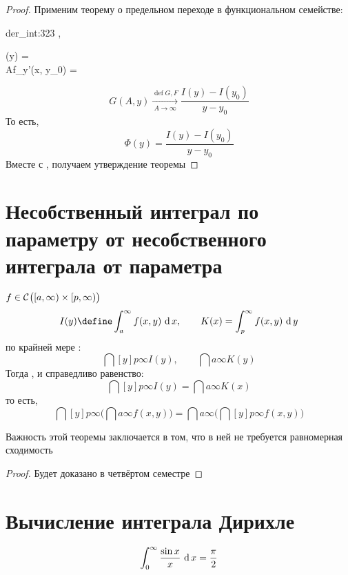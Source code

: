 \begin{proof}
	Применим теорему о предельном переходе в функциональном семействе:
	\begin{equ}{der_int:323}
		,  \implies
		\begin{cases}
			\exist {} \Phi(y) =  \\
			\exist {} A{f_y'(x, y_0)} = 
		\end{cases}
	\end{equ}
	$$ G(A, y) \xrightarrow[A \to \infty]{\operatorname{def} G, F} \frac{I(y) - I(y_0)}{y - y_0} $$
	То есть,
	$$ \Phi(y) = \frac{I(y) - I(y_0)}{y - y_0} $$
	Вместе с , получаем утверждение теоремы
\end{proof}

\section{Несобственный интеграл по параметру от несобственного интеграла от параметра}

\begin{theorem}
	$ f \in \Cont{[a, \infty) \times [p, \infty)} $
	$$ I(y) \define \dint{a}\infty{f(x, y)}, \qquad K(x) = \dint[y]p\infty{f(x, y)} $$
	 по крайней мере :
	$$ \dint[y]p\infty{I(y)}, \qquad \dint{a}\infty{K(y)} $$
	Тогда , и справедливо равенство:
	$$ \dint[y]p\infty{I(y)} \bm= \dint{a}\infty{K(x)} $$
	то есть,
	$$ \dint[y]p\infty{\bigg( \dint{a}\infty{f(x, y)} \bigg)} \bm= \dint{a}\infty{\bigg( \dint[y]p\infty{f(x, y)} \bigg)} $$
\end{theorem}

\begin{remark}
	Важность этой теоремы заключается в том, что в ней не требуется равномерная сходимость
\end{remark}

\begin{proof}
	Будет доказано в четвёртом семестре
\end{proof}

\section{Вычисление интеграла Дирихле}

\begin{theorem}
	$$ \dint0\infty{\frac{\sin x}x} = \half[\pi] $$
\end{theorem}

